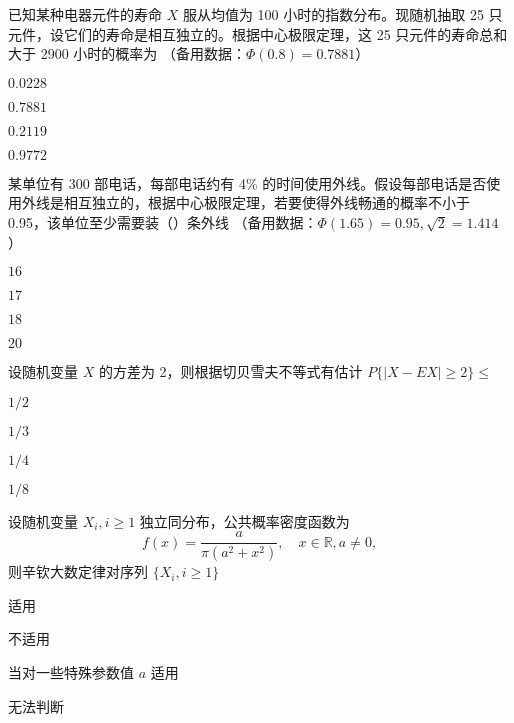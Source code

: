 \documentclass{exam-zh}
\begin{document}
\begin{question}
  已知某种电器元件的寿命 $X$ 服从均值为 100 小时的指数分布。现随机抽取 25 只元件，设它们的寿命是相互独立的。根据中心极限定理，这 25 只元件的寿命总和大于 2900 小时的概率为 
  （备用数据：$\Phi(0.8) = 0.7881$）
  \paren[C]

  \begin{choices}
    \item $0.0228$
    \item $0.7881$
    \item $0.2119$
    \item $0.9772$
  \end{choices}
\end{question}

\begin{question}
  某单位有 300 部电话，每部电话约有 4\% 的时间使用外线。假设每部电话是否使用外线是相互独立的，根据中心极限定理，若要使得外线畅通的概率不小于 0.95，该单位至少需要装（\quad ）条外线
  （备用数据：$\Phi(1.65) = 0.95, \sqrt{2} = 1.414$）
  \paren[C]
  \begin{choices}
    \item $16$
    \item $17$
    \item $18$
    \item $20$
  \end{choices}
\end{question}

\begin{question}
  设随机变量 $X$ 的方差为 2，则根据切贝雪夫不等式有估计
  $P\{ |X - EX| \geq 2\} \leq$
  \paren[A]
  \begin{choices}
    \item $1/2$
    \item $1/3$
    \item $1/4$
    \item $1/8$
  \end{choices}
\end{question}

\begin{question}
  设随机变量 $X_i, i \geq 1$ 独立同分布，公共概率密度函数为
  $$
  f(x) = \frac{a}{\pi(a^2 + x^2)}, \quad x \in \mathbb{R}, a \neq 0,
  $$
  则辛钦大数定律对序列 $\{X_i, i \geq 1\}$ \paren[B]
  \begin{choices}
    \item 适用
    \item 不适用
    \item 当对一些特殊参数值 $a$ 适用
    \item 无法判断
  \end{choices}
\end{question}
\end{document}
